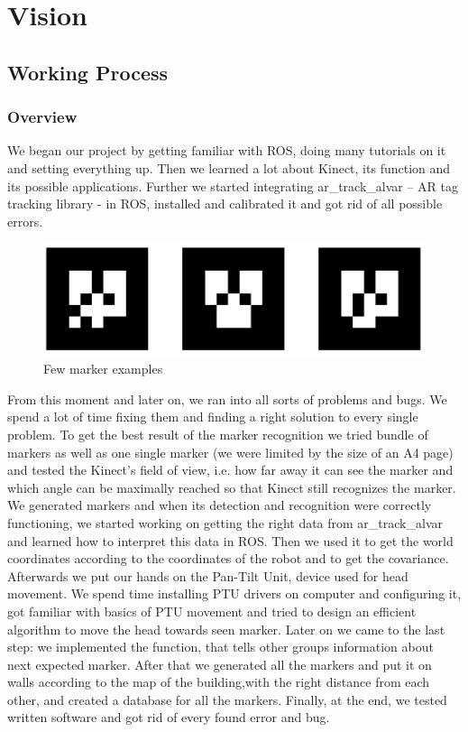 \chapter{Vision}

\section{Working Process}
\subsection{Overview}

We began our project by getting familiar with ROS, doing many tutorials on it and setting everything up. Then we learned a lot about Kinect, its function and its possible applications. Further we started integrating ar\_track\_alvar – AR tag tracking library -  in ROS, installed and calibrated it and got rid of all possible errors. \\
\begin{figure}
\begin{center}
\includegraphics[width=\linewidth]{graphics/markers.png}
\caption{Few marker examples}
\label{Few marker examples}
\end{center}
\end{figure}
From this moment and later on, we ran into all sorts of problems and bugs. We spend a lot of time fixing them and finding a right solution to every single problem. To get the best result of the marker recognition we tried bundle of markers as well as one single marker (we were limited by the size of an A4 page) and tested the Kinect's field of view, i.e. how far away it can see the marker and which angle can be maximally reached so that Kinect still recognizes the marker. We generated markers and when its detection and recognition were correctly functioning, we started working on getting the right data from ar\_track\_alvar and learned how to interpret this data in ROS. Then we used it to get the world coordinates according to the coordinates of the robot and to get the covariance. Afterwards we put our hands on the Pan-Tilt Unit, device used for head movement. We spend time installing PTU drivers on computer and configuring it, got familiar with basics of PTU movement and tried to design an efficient algorithm to move the head towards seen marker. Later on we came to the last step: we implemented the function, that tells other groups information about next expected marker. After that we generated all the markers and put it on walls according to the map of the building,with the right distance from each other, and created a database for all the markers. Finally, at the end, we tested written software and got rid of every found error and bug.

